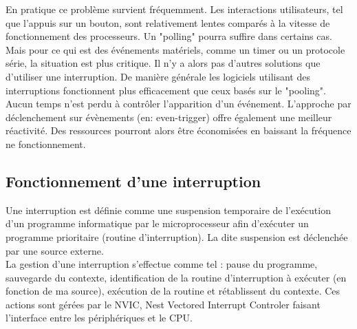 \documentclass[a4paper]{article}
\begin{document}
	En pratique ce problème survient fréquemment. Les interactions utilisateurs, tel que l'appuis sur un bouton, sont relativement lentes comparés à la vitesse de fonctionnement des processeurs. Un "polling" pourra suffire dans certains cas. Mais pour ce qui est des événements matériels, comme un timer ou un protocole série, la situation est plus critique. Il n'y a alors pas d'autres solutions que d'utiliser une interruption. De manière générale les logiciels utilisant des interruptions fonctionnent plus efficacement que ceux basés sur le "pooling". Aucun temps n'est perdu à contrôler l'apparition d'un événement. L'approche par déclenchement sur évènements (en: even-trigger) offre également une meilleur réactivité. Des ressources pourront alors être économisées en baissant la fréquence ne fonctionnement. \cite{ARM_book}
	\subsection{Fonctionnement d'une interruption }
	Une interruption est définie comme une suspension temporaire de l'exécution d'un programme informatique par le microprocesseur afin d'exécuter un programme prioritaire (routine d'interruption). La dite suspension est déclenchée par une source externe. \\
	La gestion d'une interruption s'effectue comme tel : pause du programme, sauvegarde du contexte, identification de la routine d'interruption à exécuter (en fonction de ma source), exécution de la routine et rétablissent du contexte. Ces actions sont gérées par le NVIC, Nest Vectored Interrupt Controler faisant l'interface entre les périphériques et le CPU.
	
	
	
	{}
	
	
\end{document}
